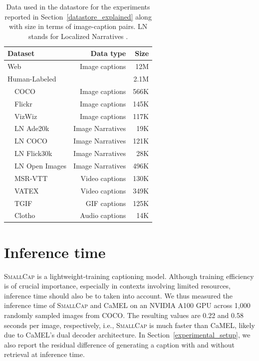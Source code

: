 \documentclass[10pt,twocolumn,letterpaper]{article}
\newcommand{\model}{\textsc{SmallCap}\xspace}
\begin{document}
\begin{table}[]
    \centering
    \begin{tabular}{lrr}
        \toprule
         Dataset & Data type & Size \\ \midrule
        Web ~\cite{li2022blip}& Image captions & 12M  \\
        Human-Labeled &~ & 2.1M\\%
        ~~COCO  \cite{chen2015microsoft} & Image captions & 566K  \\
        ~~Flickr \cite{young2014image}& Image captions& 145K \\
        ~~VizWiz  \cite{gurari2020captioning}& Image captions&   117K\\
         ~~LN Ade20k\cite{pont2020connecting} & Image Narratives & 19K\\
        ~~LN COCO\cite{pont2020connecting}& Image Narratives& 121K \\
        ~~LN Flick30k\cite{pont2020connecting} & Image Narratives& 28K   \\
        ~~LN Open Images \cite{pont2020connecting}& Image Narratives &496K\\%
        ~~MSR-VTT  \cite{xu2016msr}& Video captions &  130K \\
        ~~VATEX  \cite{wang2019vatex}& Video captions & 349K  \\
        ~~TGIF    \cite{li2016tgif} & GIF captions & 125K  \\
        ~~Clotho  \cite{drossos2020clotho}& Audio captions& 14K  \\
        \bottomrule
    \end{tabular}
    \caption{Data used in the datastore for the experiments reported in Section~\ref{datastore_explained} along with size in terms of image-caption pairs. LN stands for Localized Narratives \cite{pont2020connecting}.} 
    \label{tab:size_of_data}
\end{table}


\section{Inference time}
\label{inference_time}

\model is a lightweight-training captioning model. Although training efficiency is of crucial importance, especially in contexts involving limited resources, inference time should also be to taken into account. We thus measured the inference time of \model and CaMEL on an NVIDIA A100 GPU across 1,000 randomly sampled images from COCO. The resulting values are 0.22 and 0.58 seconds per image, respectively, i.e., \model is much faster than CaMEL, likely due to CaMEL's dual decoder architecture. In Section~\ref{experimental_setup}, we also report the residual difference of generating a caption with and without retrieval at inference time. 
\end{document}
